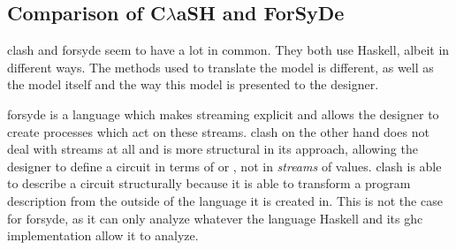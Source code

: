 \subsection{Comparison of C$\lambda$aSH and ForSyDe}
\gls{clash} and \gls{forsyde} seem to have a lot in common. 
They both use Haskell, albeit in different ways.
The methods used to translate the model is different, as well as the model itself and the way this model is presented to the designer.

\gls{forsyde} is a language which makes streaming explicit and allows the designer to create processes which act on these streams.
\gls{clash} on the other hand does not deal with streams at all and is more structural in its approach, allowing the designer to define a circuit in terms of  or , not in \textit{streams} of values. 
\gls{clash} is able to describe a circuit structurally because it is able to transform a program description from the outside of the language it is created in.
This is not the case for \gls{forsyde}, as it can only analyze whatever the language Haskell and its \gls{ghc} implementation allow it to analyze. 

